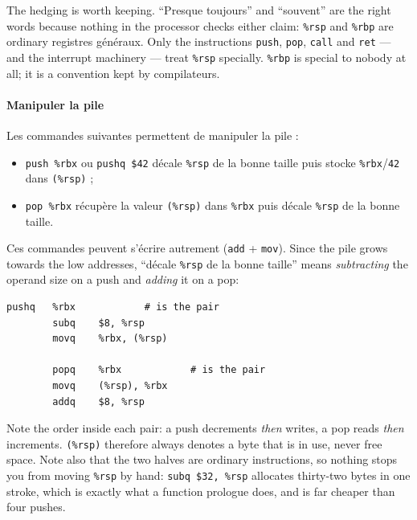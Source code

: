 \begin{remark}
  The hedging is worth keeping. ``Presque toujours'' and ``souvent'' are the
  right words because nothing in the processor checks either claim:
  \texttt{\%rsp} and \texttt{\%rbp} are ordinary registres généraux. Only the
  instructions \texttt{push}, \texttt{pop}, \texttt{call} and \texttt{ret} ---
  and the interrupt machinery --- treat \texttt{\%rsp} specially.
  \texttt{\%rbp} is special to nobody at all; it is a convention kept by
  compilateurs.
\end{remark}

\paragraph{Manipuler la pile}
Les commandes suivantes permettent de manipuler la pile :
\begin{itemize}
  \item \texttt{push \%rbx} ou \texttt{pushq \$42} décale \texttt{\%rsp} de la
    bonne taille puis stocke \texttt{\%rbx}/\texttt{42} dans \texttt{(\%rsp)} ;
  \item \texttt{pop \%rbx} récupère la valeur \texttt{(\%rsp)} dans
    \texttt{\%rbx} puis décale \texttt{\%rsp} de la bonne taille.
\end{itemize}
Ces commandes peuvent s'écrire autrement (\texttt{add} + \texttt{mov}). Since
the pile grows towards the low addresses, ``décale \texttt{\%rsp} de la bonne
taille'' means \emph{subtracting} the operand size on a push and \emph{adding}
it on a pop:

\begin{lstlisting}[language=gas]
        pushq   %rbx            # is the pair
        subq    $8, %rsp
        movq    %rbx, (%rsp)

        popq    %rbx            # is the pair
        movq    (%rsp), %rbx
        addq    $8, %rsp
\end{lstlisting}

\begin{remark}
  Note the order inside each pair: a push decrements \emph{then} writes, a pop
  reads \emph{then} increments. \texttt{(\%rsp)} therefore always denotes a byte
  that is in use, never free space. Note also that the two halves are ordinary
  instructions, so nothing stops you from moving \texttt{\%rsp} by hand:
  \texttt{subq \$32, \%rsp} allocates thirty-two bytes in one stroke, which is
  exactly what a function prologue does, and is far cheaper than four pushes.
\end{remark}

